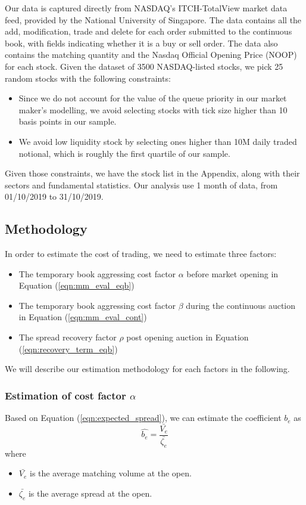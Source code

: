 \documentclass{article}
\begin{document}
Our data is captured directly from NASDAQ's ITCH-TotalView market data feed, provided by the National University of Singapore. The data contains all the add, modification, trade and delete for each order submitted to the continuous book, with fields indicating whether it is a buy or sell order. The data also contains the matching quantity and the Nasdaq Official Opening Price (NOOP) for each stock. Given the dataset of 3500 NASDAQ-listed stocks, we pick 25 random stocks with the following constraints:
\begin{itemize}
  \item Since we do not account for the value of the queue priority in our market maker's modelling, we avoid selecting stocks with tick size higher than 10 basis points in our sample.
  \item We avoid low liquidity stock by selecting ones higher than 10M daily traded notional, which is roughly the first quartile of our sample.
\end{itemize}

Given those constraints, we have the stock list in the Appendix, along with their sectors and fundamental statistics. Our analysis use 1 month of data, from 01/10/2019 to 31/10/2019.

\subsection{Methodology}

In order to estimate the cost of trading, we need to estimate three factors:
\begin{itemize}
  \item The temporary book aggressing cost factor $\alpha$ before market opening in Equation (\ref{eqn:mm_eval_eqb})
  \item The temporary book aggressing cost factor $\beta$ during the continuous auction in Equation (\ref{eqn:mm_eval_cont})
  \item The spread recovery factor $\rho$ post opening auction in Equation (\ref{eqn:recovery_term_eqb})
\end{itemize}

We will describe our estimation methodology for each factors in the following.

\subsubsection{Estimation of cost factor $\alpha$}

Based on Equation (\ref{eqn:expected_spread}), we can estimate the coefficient $b_e$ as
\[
  \hat{b_e} = \frac{\bar{V_e}}{\bar{\zeta_e}}
\]
where
\begin{itemize}
  \item $\bar{V_e}$ is the average matching volume at the open.
  \item $\bar{\zeta_e}$ is the average spread at the open.
\end{itemize}
\end{document}
